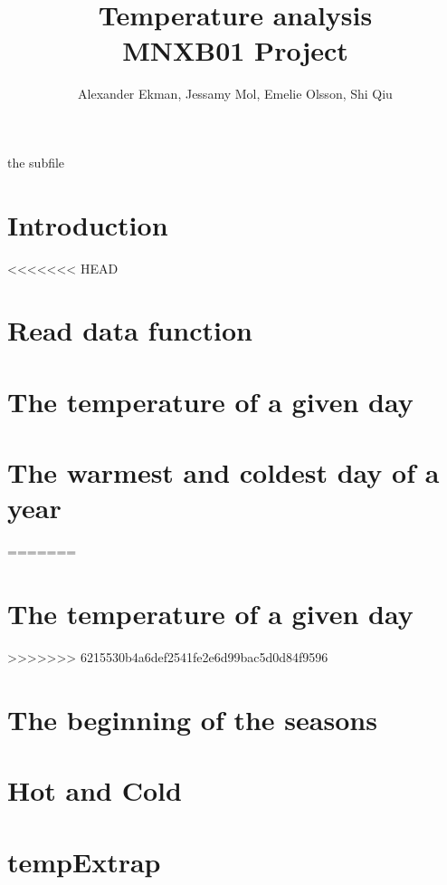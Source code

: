 \documentclass[a4paper]{article}
\title{\textbf{Temperature analysis } \\ 
\vspace{5pt}
\large MNXB01 Project}
\author{Alexander Ekman, Jessamy Mol, Emelie Olsson, Shi Qiu}
\date{ }
\begin{document}
 
 
 
the subfile

\maketitle

\vspace{-24pt}
\section{Introduction}
 


<<<<<<< HEAD
\section{Read data function}


\section{The temperature of a given day}


\section{The warmest and coldest day of a year}

=======
\section{The temperature of a given day}

>>>>>>> 6215530b4a6def2541fe2e6d99bac5d0d84f9596

\section{The beginning of the seasons}


\section{Hot and Cold}


\section{tempExtrap}


\newpage


 
\end{document}

